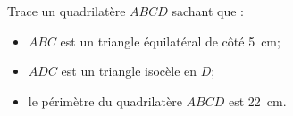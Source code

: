Trace un quadrilatère $ABCD$ sachant que :
\begin{itemize}
\item $ABC$ est un triangle équilatéral de côté 5~cm;
\item $ADC$ est un triangle isocèle en $D$;
\item le périmètre du quadrilatère $ABCD$ est 22~cm.
\end{itemize}